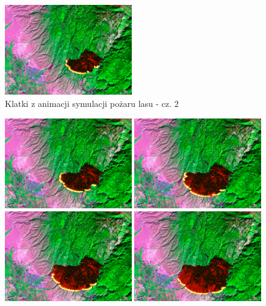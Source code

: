 \documentclass{article}
\begin{document}
\begin{figure}
        \includegraphics[width=0.49\textwidth]{resources/wildfire.overlay.068.png}
        \caption{Klatki z animacji symulacji pożaru lasu - cz. 2}
        \label{frames-2}
    \end{figure}

    \begin{figure}
        \centering
        \includegraphics[width=0.49\textwidth]{resources/wildfire.overlay.086.png}
        \includegraphics[width=0.49\textwidth]{resources/wildfire.overlay.104.png}\hfill
        \\[\smallskipamount]
        \includegraphics[width=0.49\textwidth]{resources/wildfire.overlay.111.png}\hfill
        \includegraphics[width=0.49\textwidth]{resources/wildfire.overlay.123.png}

\end{figure}
\end{document}
